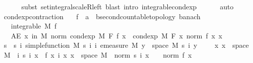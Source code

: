 \begin{isabellebody}
\ \ \ \ \ \ subst\ set{\isacharunderscore}{\kern0pt}integral{\isacharunderscore}{\kern0pt}scaleR{\isacharunderscore}{\kern0pt}left{\isacharcomma}{\kern0pt}\ blast{\isacharcomma}{\kern0pt}\ intro\ integrable{\isacharunderscore}{\kern0pt}cond{\isacharunderscore}{\kern0pt}exp{\isacharparenright}{\kern0pt}\isanewline
\ \ \ \ \ \ auto%
\endisatagproof
{\isafoldproof}%
%
\isadelimproof
\isanewline
%
\endisadelimproof
\isanewline
\isanewline
\isanewline
{}\isamarkupfalse%
\ cond{\isacharunderscore}{\kern0pt}exp{\isacharunderscore}{\kern0pt}contraction{\isacharcolon}{\kern0pt}\isanewline
\ \ \ f\ {\isacharcolon}{\kern0pt}{\isacharcolon}{\kern0pt}\ {\isachardoublequoteopen}{\isacharprime}{\kern0pt}a\ {\isasymRightarrow}\ {\isacharprime}{\kern0pt}b{\isacharcolon}{\kern0pt}{\isacharcolon}{\kern0pt}{\isacharbraceleft}{\kern0pt}second{\isacharunderscore}{\kern0pt}countable{\isacharunderscore}{\kern0pt}topology{\isacharcomma}{\kern0pt}\ banach{\isacharbraceright}{\kern0pt}{\isachardoublequoteclose}\isanewline
\ \ \ {\isachardoublequoteopen}integrable\ M\ f{\isachardoublequoteclose}\isanewline
\ \ \ {\isachardoublequoteopen}AE\ x\ in\ M{\isachardot}{\kern0pt}\ norm\ {\isacharparenleft}{\kern0pt}cond{\isacharunderscore}{\kern0pt}exp\ M\ F\ f\ x{\isacharparenright}{\kern0pt}\ {\isasymle}\ cond{\isacharunderscore}{\kern0pt}exp\ M\ F\ {\isacharparenleft}{\kern0pt}{\isasymlambda}x{\isachardot}{\kern0pt}\ norm\ {\isacharparenleft}{\kern0pt}f\ x{\isacharparenright}{\kern0pt}{\isacharparenright}{\kern0pt}\ x{\isachardoublequoteclose}\ \isanewline
%
\isadelimproof
%
\endisadelimproof
%
\isatagproof
{}\isamarkupfalse%
\ {\isacharminus}{\kern0pt}\isanewline
\ \ \isamarkupfalse%
\ s\ \ s{\isacharcolon}{\kern0pt}\ {\isachardoublequoteopen}{\isasymAnd}i{\isachardot}{\kern0pt}\ simple{\isacharunderscore}{\kern0pt}function\ M\ {\isacharparenleft}{\kern0pt}s\ i{\isacharparenright}{\kern0pt}{\isachardoublequoteclose}\ {\isachardoublequoteopen}{\isasymAnd}i{\isachardot}{\kern0pt}\ emeasure\ M\ {\isacharbraceleft}{\kern0pt}y\ {\isasymin}\ space\ M{\isachardot}{\kern0pt}\ s\ i\ y\ {\isasymnoteq}\ {}{\isacharbraceright}{\kern0pt}\ {\isasymnoteq}\ {\isasyminfinity}{\isachardoublequoteclose}\ {\isachardoublequoteopen}{\isasymAnd}x{\isachardot}{\kern0pt}\ x\ {\isasymin}\ space\ M\ {\isasymLongrightarrow}\ {\isacharparenleft}{\kern0pt}{\isasymlambda}i{\isachardot}{\kern0pt}\ s\ i\ x{\isacharparenright}{\kern0pt}\ {\isasymlonglonglongrightarrow}\ f\ x{\isachardoublequoteclose}\ {\isachardoublequoteopen}{\isasymAnd}i\ x{\isachardot}{\kern0pt}\ x\ {\isasymin}\ space\ M\ {\isasymLongrightarrow}\ norm\ {\isacharparenleft}{\kern0pt}s\ i\ x{\isacharparenright}{\kern0pt}\ {\isasymle}\ {}\ {\isacharasterisk}{\kern0pt}\ norm\ {\isacharparenleft}{\kern0pt}f\ x{\isacharparenright}{\kern0pt}{\isachardoublequoteclose}\ \isanewline

\end{isabellebody}
